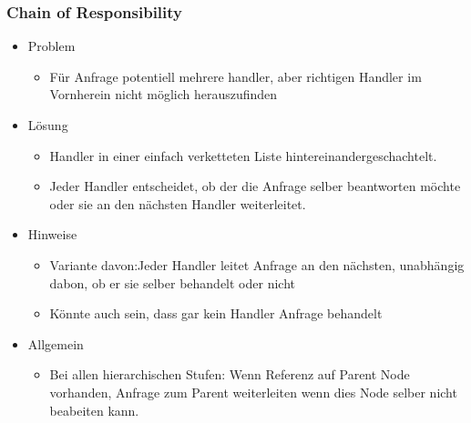 \documentclass[../ZF_SWEN1.tex]{subfiles}
\begin{document}
\subsubsection{Chain of Responsibility}
\begin{itemize}
	\item Problem
	\begin{itemize}
		\item Für Anfrage potentiell mehrere handler, aber richtigen Handler im Vornherein nicht möglich herauszufinden
	\end{itemize}
	\item Lösung
	\begin{itemize}
		\item Handler in einer einfach verketteten Liste hintereinandergeschachtelt.
		\item Jeder Handler entscheidet, ob der die Anfrage selber beantworten möchte oder sie an den nächsten Handler weiterleitet.
	\end{itemize}
	\item Hinweise
	\begin{itemize}
		\item Variante davon:Jeder Handler leitet Anfrage an den nächsten, unabhängig dabon, ob er sie selber behandelt oder nicht
		\item Könnte auch sein, dass gar kein Handler Anfrage behandelt		
	\end{itemize}
	\item Allgemein
	\begin{itemize}
		\item Bei allen hierarchischen Stufen: Wenn Referenz auf Parent Node vorhanden, Anfrage zum Parent weiterleiten wenn dies Node selber nicht beabeiten kann.
	\end{itemize}
\end{itemize}
\end{document}
